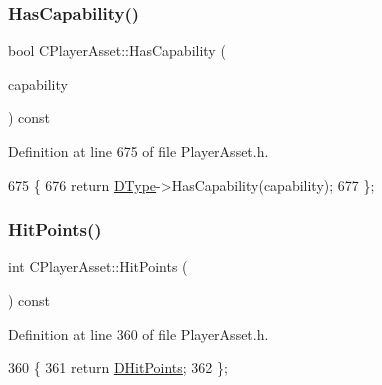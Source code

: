 \subsubsection{\texorpdfstring{Has\+Capability()}{HasCapability()}}
{\footnotesize\ttfamily bool C\+Player\+Asset\+::\+Has\+Capability (\begin{DoxyParamCaption}\item[{\hyperlink{GameDataTypes_8h_a35b98ce26aca678b03c6f9f76e4778ce}{E\+Asset\+Capability\+Type}}]{capability }\end{DoxyParamCaption}) const\hspace{0.3cm}{\ttfamily [inline]}}



Definition at line 675 of file Player\+Asset.\+h.


\begin{DoxyCode}
675                                                                  \{
676             \textcolor{keywordflow}{return} \hyperlink{classCPlayerAsset_a5d61f73471e1e6f0a6ab15f2ffa7b359}{DType}->HasCapability(capability);  
677         \};
\end{DoxyCode}
\hypertarget{classCPlayerAsset_a605862c6f6e57a2c6e21030d716485bd}{}\label{classCPlayerAsset_a605862c6f6e57a2c6e21030d716485bd} 
\subsubsection{\texorpdfstring{Hit\+Points()}{HitPoints()}\hspace{0.1cm}{\footnotesize\ttfamily [1/2]}}
{\footnotesize\ttfamily int C\+Player\+Asset\+::\+Hit\+Points (\begin{DoxyParamCaption}{ }\end{DoxyParamCaption}) const\hspace{0.3cm}{\ttfamily [inline]}}



Definition at line 360 of file Player\+Asset.\+h.


\begin{DoxyCode}
360                              \{
361             \textcolor{keywordflow}{return} \hyperlink{classCPlayerAsset_a331750935bf594e665544085fb74e89d}{DHitPoints};
362         \};
\end{DoxyCode}
\hypertarget{classCPlayerAsset_a5da6f77ba278109e159d392035f4e1dd}{}\label{classCPlayerAsset_a5da6f77ba278109e159d392035f4e1dd} 
